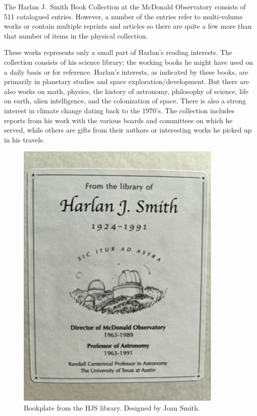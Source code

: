 

The Harlan J.~Smith Book Collection at the McDonald Observatory
consists of 511 catalogued entries. However, a number of the entries
refer to multi-volume works or contain multiple reprints and articles
so there are quite a few more than that number of items in the
physical collection.

These works represents only a small part of Harlan's reading
interests.  The collection consists of his science library;
the working books he might have used on a daily basis or for
reference.  Harlan's interests, as indicated by these books, are
primarily in planetary studies and space exploration/development. But
there are also works on math, physics, the history of astronomy,
philosophy of science, life on earth, alien intelligence, and the
colonization of space. There is also a strong interest in climate
change dating back to the 1970's.  The collection includes reports
from his work with the various boards and committees on which he
served, while others are gifts from their authors or interesting
works he picked up in his travels.

\begin{figure}
  \centering
  \includegraphics[height=0.34\textheight]{hjs_bookplate_small.png}
  {\small Bookplate from the HJS library. Designed by Joan Smith.}
  \label{fig:bookplate}
\end{figure}

